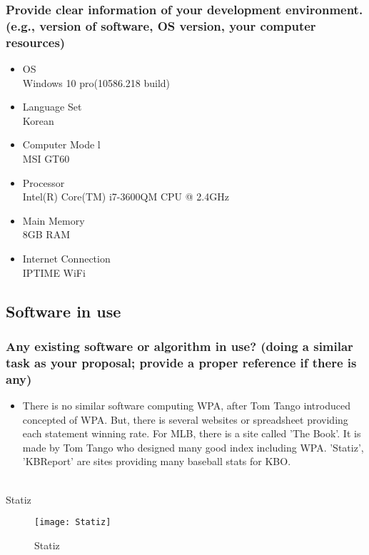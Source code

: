 \documentclass[conference,compsoc, twocolumn]{IEEEtran}
\begin{document}
\subsubsection{Provide clear information of your development environment.\\
(e.g., version of software, OS version, your computer resources)}
\begin{itemize}
\item OS \\
Windows 10 pro(10586.218 build)
\item Language Set \\
Korean
\item Computer Mode l\\
MSI GT60
\item Processor \\
Intel(R) Core(TM) i7-3600QM	CPU @ 2.4GHz
\item Main Memory \\
8GB RAM
\item Internet Connection \\
IPTIME WiFi
\end{itemize}


\subsection{Software in use}


\subsubsection{Any existing software or algorithm in use? (doing a similar task as
your proposal; provide a proper reference if there is any)}
\begin{itemize}
\item There is no similar software computing WPA, after Tom Tango introduced concepted of WPA. But, there is several websites or spreadsheet providing 
each statement winning rate. For MLB, there is a site called 'The Book'. It is made by Tom Tango who designed many good index including WPA. 'Statiz', 
'KBReport' are sites providing many baseball stats for KBO.
\end{itemize}
\\
Statiz
\begin{figure}[H]
\centering\texttt{[image: Statiz]}     
\caption{Statiz}
\end{figure}
\\
\\
\\
\end{document}

